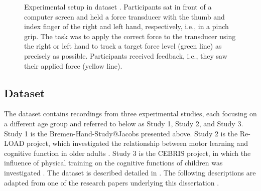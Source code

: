 \begin{figure}[h]
\begin{center}

\caption[Experimental setup in dataset .]{Experimental setup in dataset . Participants sat in front of a computer screen and held a force transducer with the thumb and index finger of the right and left hand, respectively, i.e., in a pinch grip. The task was to apply the correct force to the transducer using the right or left hand to track a target force level (green line) as precisely as possible. Participants received feedback, i.e., they saw their applied force (yellow line).}
\label{fig:DSI_exp1}
\end{center}
\end{figure}

\subsection{Dataset }
\label{methods:datasets:II}
The  dataset contains recordings from three experimental studies, each focusing on a different age group and referred to below as Study 1, Study 2, and Study 3. Study 1 is the Bremen-Hand-Study@Jacobs presented above. Study 2 is the Re-LOAD project, which investigated the relationship between motor learning and cognitive function in older adults \cite{HUBNER2018104, Hübner2018}. Study 3 is the CEBRIS project, in which the influence of physical training on the cognitive functions of children was investigated \cite{Koutsandreou2016}. The dataset is described detailed in \cite{Reuter2019}. The following descriptions are adapted from one of the research papers underlying this dissertation \cite{Goelz2023}.

